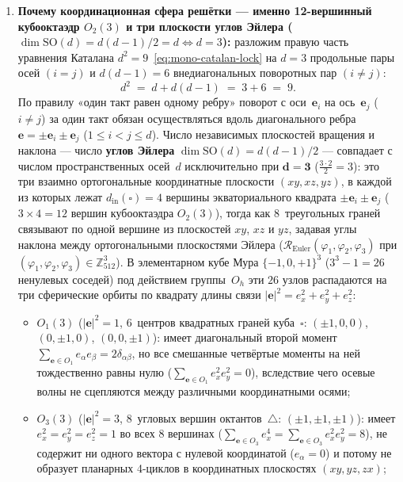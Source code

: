 \begin{enumerate}[label=\textbf{Шаг \arabic*.},leftmargin=*]
\item \textbf{Почему координационная сфера решётки --- именно 12-вершинный кубооктаэдр $O_2(3)$ и три плоскости углов Эйлера ($\dim\mathrm{SO}(d) = d(d-1)/2 = d \iff d = 3$):}
  разложим правую часть уравнения Каталана $d^2 = 9$~\eqref{eq:mono-catalan-lock} на $d = 3$ продольные пары осей $(i = j)$ и $d(d-1) = 6$ внедиагональных поворотных пар $(i \ne j)$:
  \[
    d^2 \;=\; d + d(d - 1) \;=\; 3 + 6 \;=\; 9.
  \]
  По правилу «один такт равен одному ребру» поворот с оси~$\mathbf{e}_i$ на ось~$\mathbf{e}_j$ ($i \ne j$) за один такт обязан осуществляться вдоль диагонального ребра $\mathbf{e} = \pm\mathbf{e}_i \pm\mathbf{e}_j$ ($1 \le i < j \le d$). Число независимых плоскостей вращения и наклона --- число \textbf{углов Эйлера} $\dim\mathrm{SO}(d) = d(d-1)/2$ --- совпадает с числом пространственных осей~$d$ исключительно при $\mathbf{d = 3}$ ($\frac{3\cdot 2}{2} = 3$): это три взаимно ортогональные координатные плоскости $(xy, xz, yz)$, в каждой из которых лежат $d_{\mathrm{in}}(\square) = 4$ вершины экваториального квадрата $\pm\mathbf{e}_i \pm\mathbf{e}_j$ ($3 \times 4 = 12$ вершин кубооктаэдра $O_2(3)$), тогда как $8$~треугольных граней связывают по одной вершине из плоскостей $xy$, $xz$ и $yz$, задавая углы наклона между ортогональными плоскостями Эйлера ($\mathcal{R}_{\mathrm{Euler}}(\varphi_1, \varphi_2, \varphi_3)$ при $(\varphi_1, \varphi_2, \varphi_3) \in \mathbb{Z}_{512}^3$). В элементарном кубе Мура $\{-1, 0, +1\}^3$ ($3^3 - 1 = 26$ ненулевых соседей) под действием группы~$O_h$ эти $26$ узлов распадаются на три сферические орбиты по квадрату длины связи $|\mathbf{e}|^2 = e_x^2 + e_y^2 + e_z^2$:
  \begin{itemize}[noitemsep]
  \item $O_1(3)$ ($|\mathbf{e}|^2 = 1$, $6$~центров квадратных граней куба~$\square$: $(\pm 1,0,0)$, $(0,\pm 1,0)$, $(0,0,\pm 1)$): имеет диагональный второй момент $\sum_{\mathbf{e}\in O_1} e_\alpha e_\beta = 2\delta_{\alpha\beta}$, но все смешанные четвёртые моменты на ней тождественно равны нулю ($\sum_{\mathbf{e}\in O_1} e_x^2 e_y^2 = 0$), вследствие чего осевые волны не сцепляются между различными координатными осями;
  \item $O_3(3)$ ($|\mathbf{e}|^2 = 3$, $8$~угловых вершин октантов~$\triangle$: $(\pm 1,\pm 1,\pm 1)$): имеет $e_x^2 = e_y^2 = e_z^2 = 1$ во всех $8$ вершинах ($\sum_{\mathbf{e}\in O_3} e_x^4 = \sum_{\mathbf{e}\in O_3} e_x^2 e_y^2 = 8$), не содержит ни одного вектора с нулевой координатой ($e_\alpha = 0$) и потому не образует планарных 4-циклов в координатных плоскостях $(xy, yz, zx)$;

\end{itemize}
\end{enumerate}
